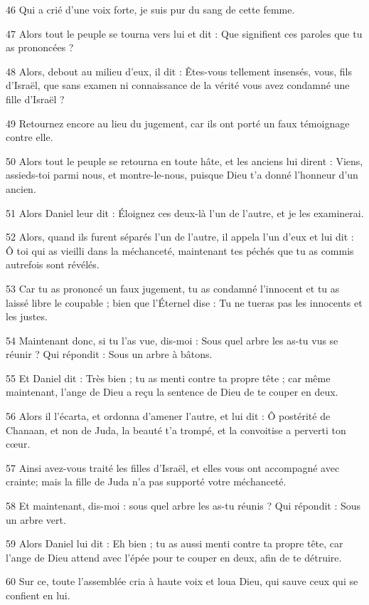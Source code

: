 \par 46 Qui a crié d'une voix forte, je suis pur du sang de cette femme.
\par 47 Alors tout le peuple se tourna vers lui et dit : Que signifient ces paroles que tu as prononcées ?
\par 48 Alors, debout au milieu d'eux, il dit : Êtes-vous tellement insensés, vous, fils d'Israël, que sans examen ni connaissance de la vérité vous avez condamné une fille d'Israël ?
\par 49 Retournez encore au lieu du jugement, car ils ont porté un faux témoignage contre elle.
\par 50 Alors tout le peuple se retourna en toute hâte, et les anciens lui dirent : Viens, assieds-toi parmi nous, et montre-le-nous, puisque Dieu t'a donné l'honneur d'un ancien.
\par 51 Alors Daniel leur dit : Éloignez ces deux-là l'un de l'autre, et je les examinerai.
\par 52 Alors, quand ils furent séparés l'un de l'autre, il appela l'un d'eux et lui dit : Ô toi qui as vieilli dans la méchanceté, maintenant tes péchés que tu as commis autrefois sont révélés.
\par 53 Car tu as prononcé un faux jugement, tu as condamné l'innocent et tu as laissé libre le coupable ; bien que l'Éternel dise : Tu ne tueras pas les innocents et les justes.
\par 54 Maintenant donc, si tu l'as vue, dis-moi : Sous quel arbre les as-tu vus se réunir ? Qui répondit : Sous un arbre à bâtons.
\par 55 Et Daniel dit : Très bien ; tu as menti contre ta propre tête ; car même maintenant, l'ange de Dieu a reçu la sentence de Dieu de te couper en deux.
\par 56 Alors il l'écarta, et ordonna d'amener l'autre, et lui dit : Ô postérité de Chanaan, et non de Juda, la beauté t'a trompé, et la convoitise a perverti ton cœur.
\par 57 Ainsi avez-vous traité les filles d'Israël, et elles vous ont accompagné avec crainte; mais la fille de Juda n'a pas supporté votre méchanceté.
\par 58 Et maintenant, dis-moi : sous quel arbre les as-tu réunis ? Qui répondit : Sous un arbre vert.
\par 59 Alors Daniel lui dit : Eh bien ; tu as aussi menti contre ta propre tête, car l'ange de Dieu attend avec l'épée pour te couper en deux, afin de te détruire.
\par 60 Sur ce, toute l'assemblée cria à haute voix et loua Dieu, qui sauve ceux qui se confient en lui.
